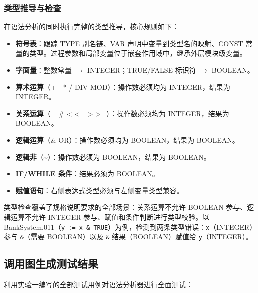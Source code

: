 \subsubsection{类型推导与检查}

在语法分析的同时执行完整的类型推导，核心规则如下：

\begin{itemize}
    \item \textbf{符号表}：跟踪 TYPE 别名链、VAR 声明中变量到类型名的映射、CONST 常量的类型。过程参数和局部变量位于嵌套作用域中，继承外层模块级变量。
    \item \textbf{字面量}：整数常量 $\to$ INTEGER；TRUE/FALSE 标识符 $\to$ BOOLEAN。
    \item \textbf{算术运算}（+ - * / DIV MOD）：操作数必须均为 INTEGER，结果为 INTEGER。
    \item \textbf{关系运算}（= \# < <= > >=）：操作数必须均为 INTEGER，结果为 BOOLEAN。
    \item \textbf{逻辑运算}（\& OR）：操作数必须均为 BOOLEAN，结果为 BOOLEAN。
    \item \textbf{逻辑非}（\~{}）：操作数必须为 BOOLEAN，结果为 BOOLEAN。
    \item \textbf{IF/WHILE 条件}：结果必须为 BOOLEAN。
    \item \textbf{赋值语句}：右侧表达式类型必须与左侧变量类型兼容。
\end{itemize}

类型检查覆盖了规格说明要求的全部场景：关系运算不允许 BOOLEAN 参与、逻辑运算不允许 INTEGER 参与、赋值和条件判断进行类型校验。以 BankSystem.011（\texttt{y := x \& TRUE}）为例，检测到两条类型错误：\texttt{x}（INTEGER）参与 \texttt{\&}（需要 BOOLEAN）以及 \texttt{\&} 结果（BOOLEAN）赋值给 \texttt{y}（INTEGER）。

\subsection{调用图生成测试结果}

利用实验一编写的全部测试用例对语法分析器进行全面测试：

